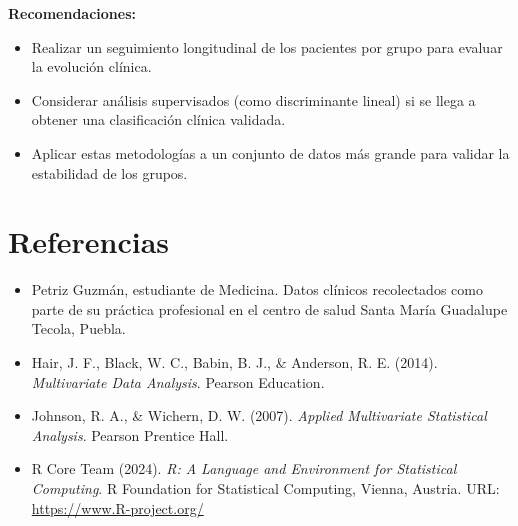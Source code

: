 \documentclass[12pt]{report}
\begin{document}
\vspace{0.5cm}
\noindent \textbf{Recomendaciones:}
\begin{itemize}
    \item Realizar un seguimiento longitudinal de los pacientes por grupo para evaluar la evolución clínica.
    \item Considerar análisis supervisados (como discriminante lineal) si se llega a obtener una clasificación clínica validada.
    \item Aplicar estas metodologías a un conjunto de datos más grande para validar la estabilidad de los grupos.
\end{itemize}

\newpage
\section{Referencias}

\begin{itemize}
    \item Petriz Guzmán, estudiante de Medicina. Datos clínicos recolectados como parte de su práctica profesional en el centro de salud Santa María Guadalupe Tecola, Puebla.

    \item Hair, J. F., Black, W. C., Babin, B. J., \& Anderson, R. E. (2014). \textit{Multivariate Data Analysis}. Pearson Education.

    \item Johnson, R. A., \& Wichern, D. W. (2007). \textit{Applied Multivariate Statistical Analysis}. Pearson Prentice Hall.

    \item R Core Team (2024). \textit{R: A Language and Environment for Statistical Computing}. R Foundation for Statistical Computing, Vienna, Austria. URL: \url{https://www.R-project.org/}
\end{itemize}
\end{document}
